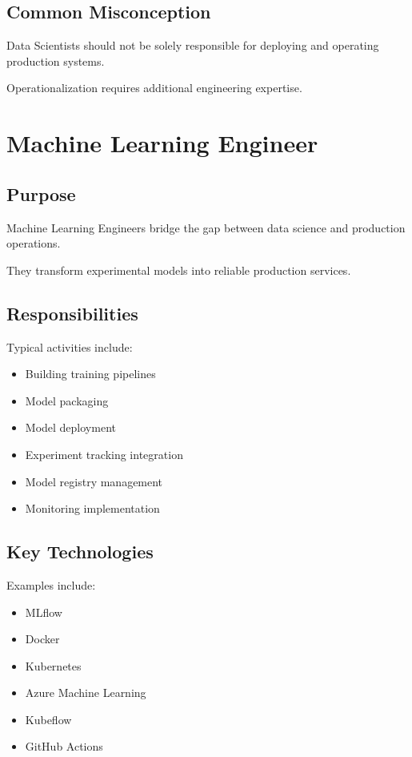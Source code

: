 \subsection{Common Misconception}

Data Scientists should not be solely responsible for deploying and operating production systems.

Operationalization requires additional engineering expertise.

\section{Machine Learning Engineer}

\subsection{Purpose}

Machine Learning Engineers bridge the gap between data science and production operations.

They transform experimental models into reliable production services.

\subsection{Responsibilities}

Typical activities include:

\begin{itemize}
    \item Building training pipelines
    \item Model packaging
    \item Model deployment
    \item Experiment tracking integration
    \item Model registry management
    \item Monitoring implementation
\end{itemize}

\subsection{Key Technologies}

Examples include:

\begin{itemize}
    \item MLflow
    \item Docker
    \item Kubernetes
    \item Azure Machine Learning
    \item Kubeflow
    \item GitHub Actions
\end{itemize}

